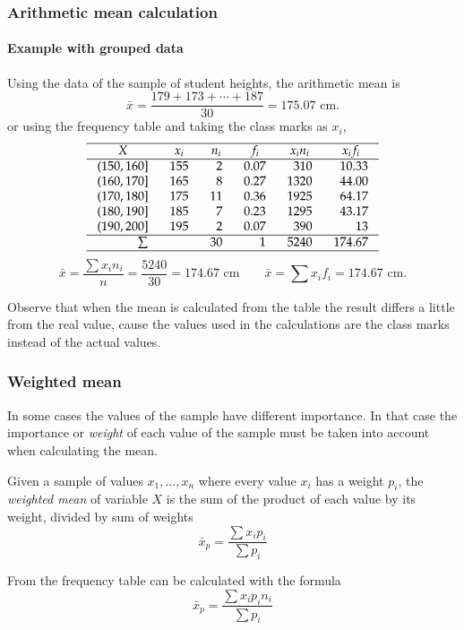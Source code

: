 \begin{frame}
\frametitle{Arithmetic mean calculation}
\framesubtitle{Example with grouped data}
Using the data of the sample of student heights, the arithmetic mean is 
\[
\bar{x} = \frac{179+173+\cdots+187}{30} = 175.07 \mbox{ cm}.
\]
or using the frequency table and taking the class marks as $x_i$,
\[
\setlength\arraycolsep{3mm}
\setlength\arrayrulewidth{0.5pt}
\begin{array}{rrrrrr}
\hline
\multicolumn{1}{c}{X} & \multicolumn{1}{c}{x_i} & \multicolumn{1}{c}{n_i} & \multicolumn{1}{c}{f_i} & \multicolumn{1}{c}{x_in_i} & \multicolumn{1}{c}{x_if_i}\\
\hline
(150,160] & 155 & 2 & 0.07 & 310 & 10.33\\
(160,170] & 165 & 8 & 0.27 & 1320 & 44.00\\
(170,180] & 175 & 11 & 0.36 & 1925 & 64.17\\
(180,190] & 185 & 7 & 0.23 & 1295 & 43.17\\
(190,200] & 195 & 2 & 0.07 & 390 & 13 \\
\hline
\sum &  & 30 & 1 & 5240 & 174.67 \\
\hline
\end{array}
\]
\[
\bar{x} = \frac{\sum x_in_i}{n} = \frac{5240}{30}= 174.67 \mbox{ cm}\qquad \bar{x}=\sum{x_if_i} = 174.67 \mbox{ cm}.
\]

Observe that when the mean is calculated from the table the result differs a little from the real value, cause the
values used in the calculations are the class marks instead of the actual values.
\end{frame}


\begin{frame}
\frametitle{Weighted mean}
In some cases the values of the sample have different importance. 
In that case the importance or \emph{weight} of each value of the sample must be taken into account when calculating
the mean. 

\begin{definition}
Given a sample of values $x_1,\ldots,x_n$ where every value $x_i$ has a weight $p_i$, the \emph{weighted
mean} of variable $X$ is the sum of the product of each value by its weight, divided by sum of weights
\[
\bar{x}_p = \frac{\sum x_ip_i}{\sum p_i}
\]
\end{definition}

From the frequency table can be calculated with the formula
\[
\bar{x}_p = \frac{\sum x_ip_in_i}{\sum p_i}
\]
\end{frame}


